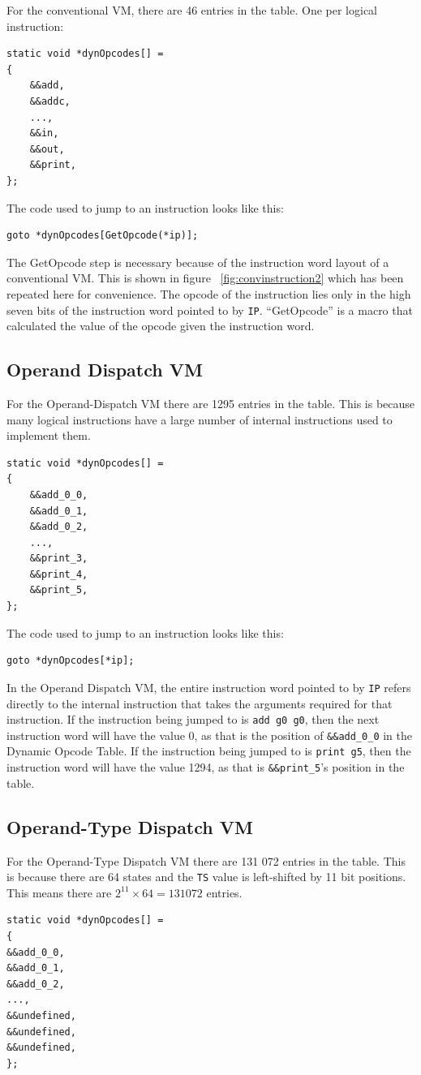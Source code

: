 \documentclass[english,a4paper,12pt]{report}
\begin{document}
For the conventional VM, there are 46 entries in the table. One per
logical instruction:
\begin{lstlisting}
static void *dynOpcodes[] = 
{
    &&add,
    &&addc,
    ...,
    &&in,
    &&out,
    &&print,
};
\end{lstlisting}

The code used to jump to an instruction looks like this:
\begin{lstlisting}
goto *dynOpcodes[GetOpcode(*ip)];
\end{lstlisting}
The GetOpcode step is necessary because of the instruction word layout
of a conventional VM. This is shown in figure
~\ref{fig:convinstruction2} which has been repeated here for
convenience. The opcode of the instruction lies only in the high seven
bits of the instruction word pointed to by \verb|IP|. ``GetOpcode'' is
a macro that calculated the value of the opcode given the instruction
word.


\subsection{Operand Dispatch VM}
\label{sec:operand-dispatch-dispatch}
For the Operand-Dispatch VM there are 1295 entries in the table. This
is because many logical instructions have a large number of internal
instructions used to implement them.
\begin{lstlisting}
static void *dynOpcodes[] = 
{
    &&add_0_0,
    &&add_0_1,
    &&add_0_2,
    ...,
    &&print_3,
    &&print_4,
    &&print_5,	
};	
\end{lstlisting}

The code used to jump to an instruction looks like this:
\begin{lstlisting}
goto *dynOpcodes[*ip];
\end{lstlisting}

In the Operand Dispatch VM, the entire instruction word pointed to by
\verb|IP| refers directly to the internal instruction that takes the
arguments required for that instruction. If the instruction being
jumped to is \verb|add g0 g0|, then the next instruction word will
have the value 0, as that is the position of \verb|&&add_0_0| in the
Dynamic Opcode Table. If the instruction being jumped to is
\verb|print g5|, then the instruction word will have the value 1294,
as that is \verb|&&print_5|'s position in the table.

\subsection{Operand-Type Dispatch VM}
\label{sec:operand-type-dispatch-dispatch}
For the Operand-Type Dispatch VM there are 131 072 entries in the
table. This is because there are 64 states and the \verb|TS| value is
left-shifted by 11 bit positions. This means there are
$2^{11} \times 64 = 131 072$ entries.
\begin{lstlisting}
static void *dynOpcodes[] = 
{
&&add_0_0,
&&add_0_1,
&&add_0_2,
...,
&&undefined,
&&undefined,
&&undefined,	
};	
\end{lstlisting}
\end{document}
